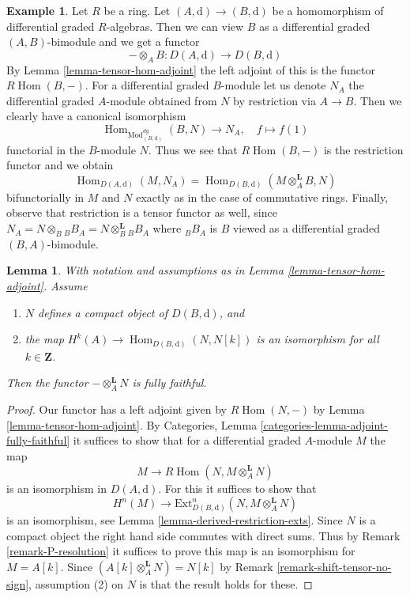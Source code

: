 \documentclass{stacks-project}
\theoremstyle{plain}
\newtheorem{lemma}[subsection]{Lemma}
\theoremstyle{definition}
\newtheorem{example}[subsection]{Example}
\theoremstyle{remark}
\numberwithin{equation}{subsection}
\def\Hom{\mathop{\mathrm{Hom}}\nolimits}
\begin{document}
\begin{example}
\label{example-map-hom-tensor}
Let $R$ be a ring. Let $(A, \text{d}) \to (B, \text{d})$ be a
homomorphism of differential graded $R$-algebras. Then we can
view $B$ as a differential graded $(A, B)$-bimodule and we get a functor
$$
- \otimes_A B : D(A, \text{d}) \longrightarrow D(B, \text{d})
$$
By Lemma \ref{lemma-tensor-hom-adjoint} the left adjoint of this
is the functor $R\Hom(B, -)$. For a differential graded $B$-module
let us denote $N_A$ the differential graded $A$-module obtained
from $N$ by restriction via $A \to B$. Then we clearly have
a canonical isomorphism
$$
\Hom_{\text{Mod}^{dg}_{(B, \text{d})}}(B, N) \longrightarrow N_A,\quad
f \longmapsto f(1)
$$
functorial in the $B$-module $N$. Thus we see that
$R\Hom(B, -)$ is the restriction functor and we obtain
$$
\Hom_{D(A, \text{d})}(M, N_A) =
\Hom_{D(B, \text{d})}(M \otimes^\mathbf{L}_A B, N)
$$
bifunctorially in $M$ and $N$ exactly as in the case of commutative rings.
Finally, observe that restriction is a tensor functor as well,
since $N_A = N \otimes_B {}_BB_A = N \otimes_B^\mathbf{L} {}_BB_A$
where ${}_BB_A$ is $B$ viewed as a differential graded $(B, A)$-bimodule.
\end{example}

\begin{lemma}
\label{lemma-tensor-with-compact-fully-faithful}
With notation and assumptions as in Lemma \ref{lemma-tensor-hom-adjoint}.
Assume
\begin{enumerate}
\item $N$ defines a compact object of $D(B, \text{d})$, and
\item the map $H^k(A) \to \Hom_{D(B, \text{d})}(N, N[k])$ is an
isomorphism for all $k \in \mathbf{Z}$.
\end{enumerate}
Then the functor $-\otimes_A^\mathbf{L} N$ is fully faithful.
\end{lemma}

\begin{proof}
Our functor has a left adjoint given by
$R\Hom(N, -)$ by Lemma \ref{lemma-tensor-hom-adjoint}.
By Categories, Lemma \ref{categories-lemma-adjoint-fully-faithful}
it suffices to show that for a differential graded $A$-module $M$
the map
$$
M \longrightarrow R\Hom(N, M \otimes_A^\mathbf{L} N)
$$
is an isomorphism in $D(A, \text{d})$. For this it suffices to show that
$$
H^n(M) \longrightarrow
\text{Ext}^n_{D(B, \text{d})}(N, M \otimes_A^\mathbf{L} N)
$$
is an isomorphism, see Lemma \ref{lemma-derived-restriction-exts}.
Since $N$ is a compact object the right hand side commutes
with direct sums. Thus by Remark \ref{remark-P-resolution}
it suffices to prove this map is an isomorphism for $M = A[k]$.
Since $(A[k] \otimes_A^\mathbf{L} N) = N[k]$ by
Remark \ref{remark-shift-tensor-no-sign},
assumption (2) on $N$ is that the result holds for these.
\end{proof}
\end{document}
